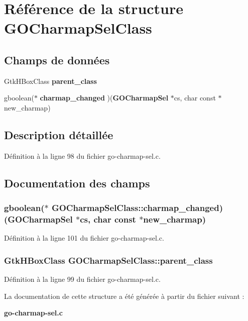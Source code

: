 \section{Référence de la structure GOCharmapSelClass}
\label{structGOCharmapSelClass}
\subsection*{Champs de données}
\begin{DoxyCompactItemize}
\item 
GtkHBoxClass {\bf parent\_\-class}
\item 
gboolean($\ast$ {\bf charmap\_\-changed} )({\bf GOCharmapSel} $\ast$cs, char const $\ast$new\_\-charmap)
\end{DoxyCompactItemize}


\subsection{Description détaillée}


Définition à la ligne 98 du fichier go-\/charmap-\/sel.c.



\subsection{Documentation des champs}
\subsubsection[{charmap\_\-changed}]{\setlength{\rightskip}{0pt plus 5cm}gboolean($\ast$  {\bf GOCharmapSelClass::charmap\_\-changed})({\bf GOCharmapSel} $\ast$cs, char const $\ast$new\_\-charmap)}\label{structGOCharmapSelClass_a9bb2d476af00f15c18c3ae42be56c9ab}


Définition à la ligne 101 du fichier go-\/charmap-\/sel.c.

\subsubsection[{parent\_\-class}]{\setlength{\rightskip}{0pt plus 5cm}GtkHBoxClass {\bf GOCharmapSelClass::parent\_\-class}}\label{structGOCharmapSelClass_af991fbaae0c077dd8009b0d3989626eb}


Définition à la ligne 99 du fichier go-\/charmap-\/sel.c.



La documentation de cette structure a été générée à partir du fichier suivant :\begin{DoxyCompactItemize}
\item 
{\bf go-\/charmap-\/sel.c}\end{DoxyCompactItemize}
